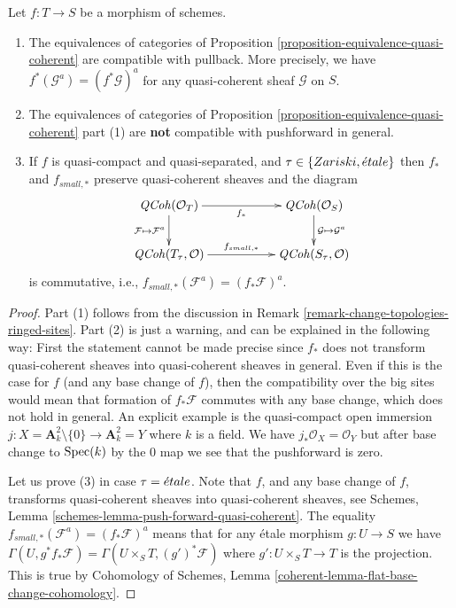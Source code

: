 \begin{proposition}
\label{proposition-equivalence-quasi-coherent-functorial}
Let $f : T \to S$ be a morphism of schemes.
\begin{enumerate}
\item The equivalences of categories of
Proposition \ref{proposition-equivalence-quasi-coherent}
are compatible with pullback.
More precisely, we have $f^*(\mathcal{G}^a) = (f^*\mathcal{G})^a$
for any quasi-coherent sheaf $\mathcal{G}$ on $S$.
\item The equivalences of categories of
Proposition \ref{proposition-equivalence-quasi-coherent} part (1)
are {\bf not} compatible with pushforward in general.
\item If $f$ is quasi-compact and quasi-separated, and
$\tau \in \{Zariski, {\acute{e}tale}\}$ then $f_*$ and $f_{small, *}$
preserve quasi-coherent sheaves and the diagram
$$
\xymatrix{
\QCoh(\mathcal{O}_T)
\ar[rr]_{f_*} \ar[d]_{\mathcal{F} \mapsto \mathcal{F}^a} & &
\QCoh(\mathcal{O}_S)
\ar[d]^{\mathcal{G} \mapsto \mathcal{G}^a} \\
\QCoh(T_\tau, \mathcal{O}) \ar[rr]^{f_{small, *}} & &
\QCoh(S_\tau, \mathcal{O})
}
$$
is commutative, i.e., $f_{small, *}(\mathcal{F}^a) = (f_*\mathcal{F})^a$.
\end{enumerate}
\end{proposition}

\begin{proof}
Part (1) follows from the discussion in
Remark \ref{remark-change-topologies-ringed-sites}.
Part (2) is just a warning, and can be explained in the following way:
First the statement cannot be made precise since $f_*$ does not
transform quasi-coherent sheaves into quasi-coherent sheaves in general.
Even if this is the case for $f$ (and any base change of $f$), then the
compatibility over the big sites would mean that formation of $f_*\mathcal{F}$
commutes with any base change, which does not hold in general.
An explicit example is the quasi-compact open immersion
$j : X = \mathbf{A}^2_k \setminus \{0\} \to \mathbf{A}^2_k = Y$
where $k$ is a field. We have $j_*\mathcal{O}_X = \mathcal{O}_Y$
but after base change to $\mathop{\mathrm{Spec}}(k)$ by the $0$ map
we see that the pushforward is zero.

\medskip\noindent
Let us prove (3) in case $\tau = {\acute{e}tale}$. Note that $f$, and any
base change of $f$, transforms quasi-coherent sheaves
into quasi-coherent sheaves, see
Schemes, Lemma \ref{schemes-lemma-push-forward-quasi-coherent}.
The equality $f_{small, *}(\mathcal{F}^a) = (f_*\mathcal{F})^a$
means that for any \'etale morphism $g : U \to S$ we have
$\Gamma(U, g^*f_*\mathcal{F}) = \Gamma(U \times_S T, (g')^*\mathcal{F})$
where $g' : U \times_S T \to T$ is the projection. This is true by
Cohomology of Schemes, Lemma \ref{coherent-lemma-flat-base-change-cohomology}.
\end{proof}


